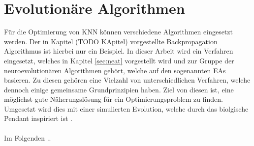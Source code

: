 \section{Evolutionäre Algorithmen}
Für die Optimierung von \ac{KNN} können verschiedene Algorithmen eingesetzt werden. Der in Kapitel (TODO KApitel) vorgestellte Backpropagation Algorithmus ist hierbei nur ein Beispiel. In dieser Arbeit wird ein Verfahren eingesetzt, welches in Kapitel \ref{sec:neat} vorgestellt wird und zur Gruppe der neuroevolutionären Algorithmen gehört, welche auf den sogenannten \acp{EA} basieren. Zu diesen gehören eine Vielzahl von unterschiedlichen Verfahren, welche dennoch einige gemeinsame Grundprinzipien haben. Ziel von diesen ist, eine möglichst gute Näherungslösung für ein Optimierungsproblem zu finden. Umgesetzt wird dies mit einer simulierten Evolution, welche durch das biolgische Pendant inspiriert ist \cite{weicker2015evolutionare}.
\\\\
Im Folgenden .. 

